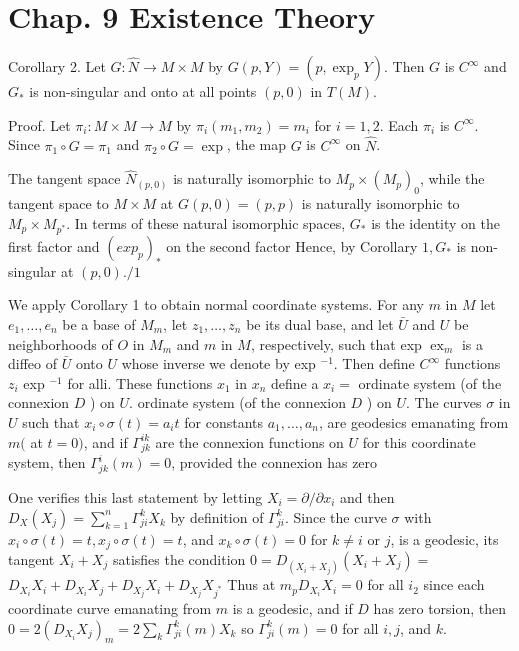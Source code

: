 \documentclass[10pt]{article}
\begin{document}
\section{Chap. 9 Existence Theory}
Corollary 2. Let $G: \widehat{N} \rightarrow M \times M$ by $G(p, Y)=\left(p, \exp _{p} Y\right)$. Then $G$ is $C^{\infty}$ and $G_{*}$ is non-singular and onto at all points $(p, 0)$ in $T(M)$.

Proof. Let $\pi_{i}: M \times M \rightarrow M$ by $\pi_{i}\left(m_{1}, m_{2}\right)=m_{i}$ for $i=1,2$. Each $\pi_{i}$ is $C^{\infty}$. Since $\pi_{1} \circ G=\pi_{1}$ and $\pi_{2} \circ G=\exp$, the map $G$ is $C^{\infty}$ on $\hat{N}$.

The tangent space $\hat{N}_{(p, 0)}$ is naturally isomorphic to $M_{p} \times\left(M_{p}\right)_{0}$, while the tangent space to $M \times M$ at $G(p, 0)=(p, p)$ is naturally isomorphic to $M_{p} \times M_{p^{*}}$. In terms of these natural isomorphic spaces, $G_{*}$ is the identity on the first factor and $\left(e x p_{p}\right)_{*}$ on the second factor Hence, by Corollary $1, G_{*}$ is non-singular at $(p, 0) . / 1$

We apply Corollary 1 to obtain normal coordinate systems. For any $m$ in $M$ let $e_{1}, \ldots, e_{n}$ be a base of $M_{m}$, let $z_{1}, \ldots, z_{n}$ be its dual base, and let $\bar{U}$ and $U$ be neighborhoods of $O$ in $M_{m}$ and $m$ in $M$, respectively, such that exp $\operatorname{ex}_{m}$ is a diffeo of $\bar{U}$ onto $U$ whose inverse we denote by exp ${ }^{-1}$. Then define $C^{\infty}$ functions $z_{i}$ exp ${ }^{-1}$ for alli. These functions $x_{1}$ in $x_{n}$ define a $x_{i}=$ ordinate system (of the connexion $D$ ) on $U .$ ordinate system (of the connexion $D$ ) on $U$. The curves $\sigma$ in $U$ such that $x_{i} \circ \sigma(t)=a_{i} t$ for constants $a_{1}, \ldots, a_{n}$, are geodesics emanating from $m($ at $t=0)$, and if $\Gamma_{j k}^{i k}$ are the connexion functions on $U$ for this coordinate system, then $\Gamma_{j k}^{i}(m)=0$, provided the connexion has zero

One verifies this last statement by letting $X_{i}=\partial / \partial x_{i}$ and then $D_{X}\left(X_{j}\right)=\sum_{k=1}^{n} \Gamma_{j i}^{k} X_{k}$ by definition of $\Gamma_{j i}^{k}$. Since the curve $\sigma$ with $x_{i} \circ \sigma(t)=t, x_{j} \circ \sigma(t)=t$, and $x_{k} \circ \sigma(t)=0$ for $k \neq i$ or $j$, is a geodesic, its tangent $X_{i}+X_{j}$ satisfies the condition $0=D_{\left(X_{i}+X_{j}\right)}\left(X_{i}+X_{j}\right)=$ $D_{X_{i}} X_{i}+D_{X_{i}} X_{j}+D_{X_{j}} X_{i}+D_{X_{j}} X_{j^{*}}$ Thus at $m_{p} D_{X_{i}} X_{i}=0$ for all $i_{2}$ since each coordinate curve emanating from $m$ is a geodesic, and if $D$ has zero torsion, then $0=2\left(D_{X_{i}} X_{j}\right)_{m}=2 \sum_{k} \Gamma_{j i}^{k}(m) X_{k}$ so $\Gamma_{j i}^{k}(m)=0$ for all $i, j$, and $k$.
\end{document}
